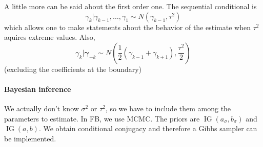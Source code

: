 \documentclass{article}
\DeclareMathOperator*{\IG}{\operatorname{IG}}
\begin{document}
    A little more can be said about the first order one. The sequential conditional is 
    \[\gamma_k | \gamma_{k-1}, \ldots , \gamma_1 \sim N(\gamma_{k-1}, \tau^2)\]
    which allows one to make statements about the behavior of the estimate when \(\tau^2\) aquires extreme values. Also, 
    \[\gamma_{k}|\boldsymbol\gamma_{-k} \sim N\left(\frac{1}{2}(\gamma_{k-1} + \gamma_{k+1}), \frac{\tau^2}{2}\right)\] 
    (excluding the coefficients at the boundary)

    \paragraph{Bayesian inference}

    We actually don't know \(\sigma^2\) or \(\tau^2\), so we have to include them among the parameters to estimate. In FB, we use MCMC. The priors are \(\IG(a_\sigma, b_\sigma)\) and \(\IG(a,b)\). We obtain conditional conjugacy and therefore a Gibbs sampler can be implemented.




    




    
\end{document}
